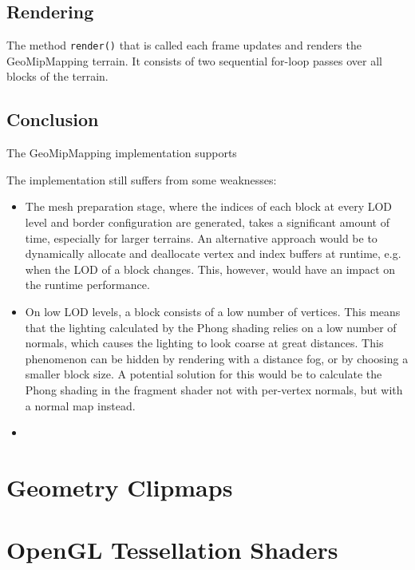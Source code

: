\subsection{Rendering}
The method \texttt{render()} that is called each frame updates and renders the GeoMipMapping terrain. 
It consists of two sequential for-loop passes over all blocks of the terrain.  

\subsection{Conclusion}
The GeoMipMapping implementation supports 


The implementation still suffers from some weaknesses:
\begin{itemize}
  \item The mesh preparation stage, where 
        the indices of each block at every LOD level and border configuration are generated, 
        takes a significant amount of time, especially for larger terrains.
        An alternative approach would be to dynamically allocate and deallocate vertex and index buffers
        at runtime, e.g. when the LOD of a block changes. This, however, would 
        have an impact on the runtime performance. 
  \item On low LOD levels, a block consists of a low number of vertices. 
        This means that the lighting calculated by the Phong shading relies on a low number of normals, 
        which causes the lighting to look coarse at great distances.
        This phenomenon can be hidden by rendering with a distance fog, or by 
        choosing a smaller block size. 
        A potential solution for this would be to calculate the Phong shading in the fragment shader
        not with per-vertex normals, but with a normal map instead.

  \item 
\end{itemize}

\section{Geometry Clipmaps}

\section{OpenGL Tessellation Shaders}

